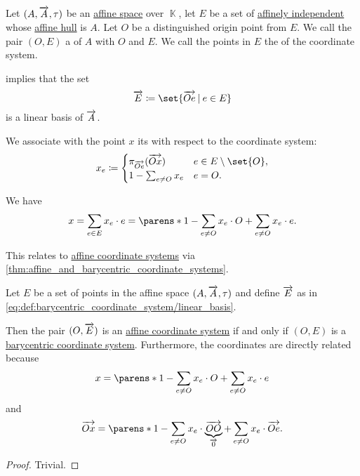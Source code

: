 \begin{definition}\label{def:barycentric_coordinate_system}
  Let \( (A, \overrightarrow{A}, \tau) \) be an \hyperref[def:affine_space]{affine space} over \( \BbbK \), let \( E \) be a set of \hyperref[def:affine_dependence]{affinely independent} whose \hyperref[def:affine_hull]{affine hull} is \( A \). Let \( O \) be a distinguished origin point from \( E \). We call the pair \( (O, E) \) a  of \( A \) with  \( O \) and  \( E \). We call the points in \( E \) the  of the coordinate system.

   implies that the set
  \begin{equation}\label{eq:def:barycentric_coordinate_system/linear_basis}
    \vect E \coloneqq \set{ \vect{Oe} \given e \in E }
  \end{equation}
  is a linear basis of \( \overrightarrow{A} \).

  We associate with the point \( x \) its  with respect to the coordinate system:
  \begin{equation*}
    x_e \coloneqq \begin{cases}
      \pi_{\vect{Oe}}(\vect{Ox}) &e \in E \setminus \set{ O }, \\
      1 - \sum_{e \neq O} x_e    &e = O.
    \end{cases}
  \end{equation*}

  We have
  \begin{equation}\label{eq:def:barycentric_coordinate_system/coordinates}
    x = \sum_{e \in E} x_e \cdot e = \parens*{ 1 - \sum_{e \neq O} x_e } \cdot O + \sum_{e \neq O} x_e \cdot e.
  \end{equation}

  This relates to \hyperref[def:affine_coordinate_system]{affine coordinate systems} via \cref{thm:affine_and_barycentric_coordinate_systems}.
\end{definition}

\begin{proposition}\label{thm:affine_and_barycentric_coordinate_systems}
  Let \( E \) be a set of points in the affine space \( (A, \overrightarrow{A}, \tau) \) and define \( \overrightarrow{E} \) as in \eqref{eq:def:barycentric_coordinate_system/linear_basis}.

  Then the pair \( (O, \overrightarrow{E}) \) is an \hyperref[def:affine_coordinate_system]{affine coordinate system} if and only if \( (O, E) \) is a \hyperref[def:barycentric_coordinate_system]{barycentric coordinate system}. Furthermore, the coordinates are directly related because
  \begin{equation*}
    x = \parens*{ 1 - \sum_{e \neq O} x_e } \cdot O + \sum_{e \neq O} x_e \cdot e
  \end{equation*}
  and
  \begin{equation*}
    \vect{Ox} = \parens*{ 1 - \sum_{e \neq O} x_e } \cdot \underbrace{\vect{OO}}_{\vect 0} + \sum_{e \neq O} x_e \cdot \vect{Oe}.
  \end{equation*}
\end{proposition}
\begin{proof}
  Trivial.
\end{proof}

